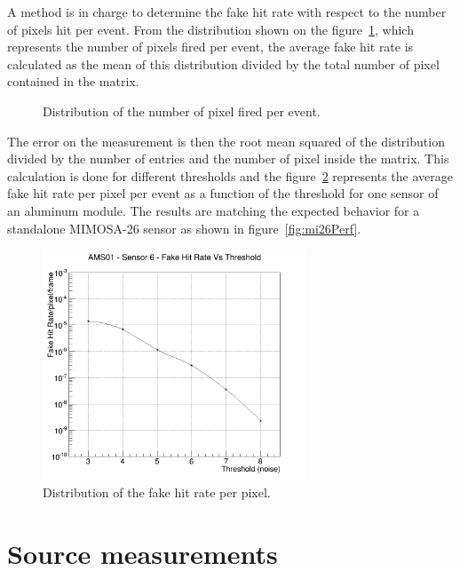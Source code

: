   A method is in charge to determine the fake hit rate with respect to the number of pixels hit per event.
  From the distribution shown on the figure~\ref{fig:pixel/event}, which represents the number of pixels fired per event, the average fake hit rate is calculated as the mean of this distribution divided by the total number of pixel contained in the matrix.
    \begin{figure}
    \caption{Distribution of the number of pixel fired per event.}
    \label{fig:pixel/event}
  \end{figure}
  The error on the measurement is then the root mean squared of the distribution divided by the number of entries and the number of pixel inside the matrix.
  This calculation is done for different thresholds and the figure~\ref{fig:FHR} represents the average fake hit rate per pixel per event as a function of the threshold for one sensor of an aluminum module.
  The results are matching the expected behavior for a standalone MIMOSA-26 sensor as shown in figure~\ref{fig:mi26Perf}.

  \begin{figure}
    \centering
    \includegraphics[width=0.7\textwidth]{Pictures/labTests/fake_sensor6.png}
    \caption{Distribution of the fake hit rate per pixel.}
    \label{fig:FHR}
  \end{figure}

\section{Source measurements}

  \begin{figure}
  \end{figure}
